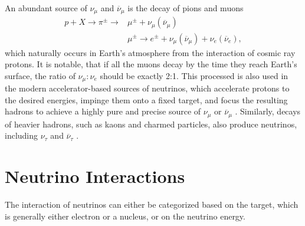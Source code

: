 
An abundant source of $\nu_\mu$ and $\overline{\nu}_\mu$ is the decay of pions and muons
\begin{align}
p+X \rightarrow \pi^\pm \rightarrow &\mu^\pm + \nu_\mu\left(\overline{\nu}_\mu\right) \\
 & \mu^\pm \rightarrow e^\pm + \nu_\mu\left(\overline{\nu}_\mu\right) + \nu_e\left(\overline{\nu}_e\right),
\end{align}
which naturally occurs in Earth's atmosphere from the interaction of cosmic ray protons. It is notable, that if all the muons decay by the time they reach Earth's surface, the ratio of $\nu_\mu : \nu_e$ should be exactly 2:1. This processed is also used in the modern accelerator-based sources of neutrinos, which accelerate protons to the desired energies, impinge them onto a fixed target, and focus the resulting hadrons to achieve a highly pure and precise source of $\nu_\mu$ or $\overline{\nu}_\mu$ \cite{GoodmanAdvancesInNeutrinoPhysics.pdf, SchwartzAccelerators.pdf}. Similarly, decays of heavier hadrons, such as kaons and charmed particles, also produce neutrinos, including $\nu_\tau$ and $\overline{\nu}_\tau$ \cite{ObservationOfTauNeutrino.pdf, FinalTauNeutrinoResultsDONUT2008.pdf}.


\section{Neutrino Interactions}
The interaction of neutrinos can either be categorized based on the target, which is generally either electron or a nucleus, or on the neutrino energy.

